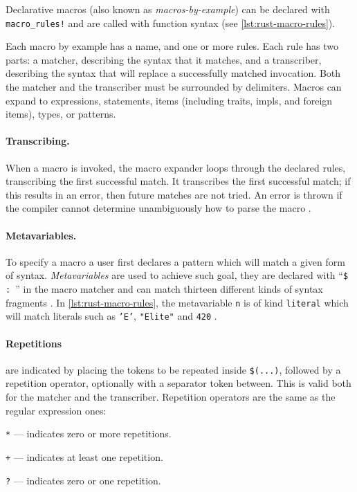 Declarative macros (also known as \emph{macros-by-example}) can be declared with \texttt{macro\_rules!}
and are called with function syntax (see \autoref{lst:rust-macro-rules}).

\begin{displayquote}
	Each macro by example has a name, and one or more rules.
	Each rule has two parts: a matcher, describing the syntax that it matches, and a transcriber,
	describing the syntax that will replace a successfully matched invocation.
	Both the matcher and the transcriber must be surrounded by delimiters.
	Macros can expand to expressions, statements, items
	(including traits, impls, and foreign items), types, or patterns.
\end{displayquote}

\paragraph{Transcribing.}
When a macro is invoked, the macro expander loops through the declared rules, transcribing the first successful match.
It transcribes the first successful match; if this results in an error, then future matches are not tried.
An error is thrown if the compiler cannot determine unambiguously how to parse the macro
\autocite[Section 3.1 - Transcribing]{RustRef2021}.

\paragraph{Metavariables.}
To specify a macro a user first declares a pattern which will match a given form of syntax.
\emph{Metavariables} are used to achieve such goal,
they are declared with “\texttt{\$  : }” in the macro matcher and
can match thirteen different kinds of syntax fragments \autocite[Section 3.1 - Metavariables]{RustRef2021}.
In \autoref{lst:rust-macro-rules}, the metavariable \texttt{n} is of kind \texttt{literal}
which will match literals such as \texttt{'E'}, \texttt{"Elite"} and \texttt{420} \autocite[Section 8.2.1]{RustRef2021}.

\paragraph{Repetitions} are indicated by placing the tokens to be repeated inside \texttt{\$(...)},
followed by a repetition operator, optionally with a separator token between.
This is valid both for the matcher and the transcriber.
Repetition operators are the same as the regular expression ones:
\begin{compactitem}
	\item \texttt{*} — indicates zero or more repetitions.
	\item \texttt{+} — indicates at least one repetition.
	\item \texttt{?} — indicates zero or one repetition.
\end{compactitem}

